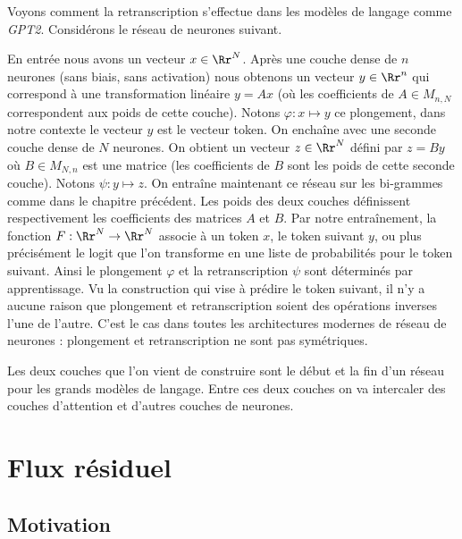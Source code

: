 \documentclass[11pt,class=report,crop=false]{standalone}
\begin{document}
Voyons comment la retranscription s'effectue dans les modèles de langage comme \emph{GPT2}.
Considérons le réseau de neurones suivant.


En entrée nous avons un vecteur $x \in \Rr^N$. Après une couche dense de $n$ neurones (sans biais, sans activation) nous obtenons un vecteur $y \in \Rr^n$ qui correspond à une transformation linéaire $y  = Ax$ (où les coefficients de $A \in M_{n,N}$ correspondent aux poids de cette couche). Notons $\varphi : x \mapsto y$ ce plongement, dans notre contexte le vecteur $y$ est le vecteur token.
On enchaîne avec une seconde couche dense de $N$ neurones. On obtient un vecteur $z \in \Rr^N$ défini par $z = B y$ où $B \in M_{N,n}$ est une matrice (les coefficients de $B$ sont les poids de cette seconde couche). Notons $\psi : y \mapsto z$.
On entraîne maintenant ce réseau sur les bi-grammes comme dans le chapitre précédent. Les poids des deux couches définissent respectivement les coefficients des matrices $A$ et $B$. 
Par notre entraînement, la fonction
$F : \Rr^N \to \Rr^N$ associe à un token $x$, le token suivant $y$, ou plus précisément le logit que l'on transforme en une liste de probabilités pour le token suivant.
Ainsi le plongement $\varphi$ et la retranscription $\psi$ sont déterminés par apprentissage.
Vu la construction qui vise à prédire le token suivant, il n'y a aucune raison que plongement et retranscription soient des opérations inverses l'une de l'autre. C'est le cas dans toutes les architectures modernes de réseau de neurones : plongement et retranscription ne sont pas symétriques.

Les deux couches que l'on vient de construire sont le début et la fin d'un réseau pour les grands modèles de langage. Entre ces deux couches on va intercaler des couches d'attention et d'autres couches de neurones.



\section{Flux résiduel}


\subsection{Motivation}
\end{document}
